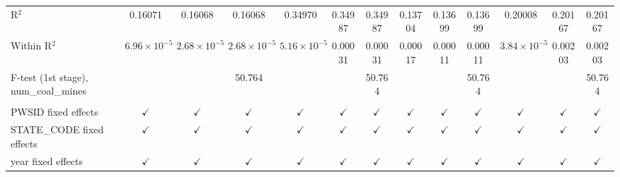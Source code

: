 \begin{table}[htbp]
\begin{adjustbox}{width = \textwidth, center}
\begin{tabular}{lcccccccccccc}
         R$^2$                                  & 0.16071               & 0.16068               & 0.16068               & 0.34970               & 0.34987       & 0.34987       & 0.13704       & 0.13699       & 0.13699       & 0.20008               & 0.20167         & 0.20167\\  
         Within R$^2$                           & $6.96\times 10^{-5}$  & $2.68\times 10^{-5}$  & $2.68\times 10^{-5}$  & $5.16\times 10^{-5}$  & 0.00031       & 0.00031       & 0.00017       & 0.00011       & 0.00011       & $3.84\times 10^{-5}$  & 0.00203         & 0.00203\\  
         F-test (1st stage), num\_coal\_mines   &                       &                       & 50.764                &                       &               & 50.764        &               &               & 50.764        &                       &                 & 50.764\\  
          \\
         PWSID fixed effects                    & $\checkmark$          & $\checkmark$          & $\checkmark$          & $\checkmark$          & $\checkmark$  & $\checkmark$  & $\checkmark$  & $\checkmark$  & $\checkmark$  & $\checkmark$          & $\checkmark$    & $\checkmark$\\   
         STATE\_CODE fixed effects              & $\checkmark$          & $\checkmark$          & $\checkmark$          & $\checkmark$          & $\checkmark$  & $\checkmark$  & $\checkmark$  & $\checkmark$  & $\checkmark$  & $\checkmark$          & $\checkmark$    & $\checkmark$\\   
         year fixed effects                     & $\checkmark$          & $\checkmark$          & $\checkmark$          & $\checkmark$          & $\checkmark$  & $\checkmark$  & $\checkmark$  & $\checkmark$  & $\checkmark$  & $\checkmark$          & $\checkmark$    & $\checkmark$\\   
         \bottomrule
      \end{tabular}
   \end{adjustbox}
\end{table}


